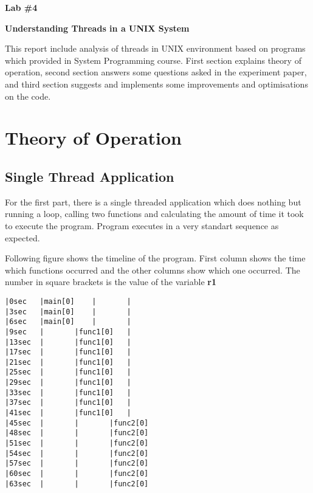 \documentclass[11pt]{article}
\makeatletter
\renewenvironment{titlepage}
    {%
      \cleardoublepage
      \if@twocolumn
        \@restonecoltrue\onecolumn
      \else
        \@restonecolfalse\newpage
      \fi
      \thispagestyle{empty}%
    }%
    {\if@restonecol\twocolumn \else \newpage \fi
    }
\renewenvironment{titlepage}
    {%
      \cleardoublepage
      \if@twocolumn
        \@restonecoltrue\onecolumn
      \else
        \@restonecolfalse\newpage
      \fi
      \thispagestyle{empty}%
    }%
    {\if@restonecol\twocolumn \else \newpage \fi
     \if@twoside\else
     \fi
    }
\makeatother
\begin{document}
\begin{titlepage}
   \begin{center}
       \vspace*{5cm}
 
       \textbf{ \LARGE Lab \#4}
       
       \vspace{0.5cm}
 	\textbf{Understanding Threads in a UNIX System }
 	
       \vspace{0.5cm}
This report include analysis of threads in UNIX environment based on programs which provided in System Programming course. First section explains theory of operation, second section answers some questions asked in the experiment paper, and third section suggests and implements some improvements and optimisations on the code.

 
   \end{center}
\end{titlepage}



\section*{Theory of Operation}

\subsection*{Single Thread Application}
For the first part, there is a single threaded application which does nothing but running a loop, calling two functions and calculating the amount of time it took to execute the program. Program executes in a very standart sequence as expected.

Following figure shows the timeline of the program. First column shows the time which functions occurred and the other columns show which one occurred. The number in square brackets is the value of the variable \textbf{r1}

\begin{minipage}{1\textwidth}
\begin{lstlisting}[title=Timeline (singlethread.c), frame=tlrb]
|0sec	|main[0]	|		|
|3sec	|main[0]	|		|
|6sec	|main[0]	|		|
|9sec	|		|func1[0]	|
|13sec	|		|func1[0]	|
|17sec	|		|func1[0]	|
|21sec	|		|func1[0]	|
|25sec	|		|func1[0]	|
|29sec	|		|func1[0]	|
|33sec	|		|func1[0]	|
|37sec	|		|func1[0]	|
|41sec	|		|func1[0]	|
|45sec	|		|		|func2[0]
|48sec	|		|		|func2[0]
|51sec	|		|		|func2[0]
|54sec	|		|		|func2[0]
|57sec	|		|		|func2[0]
|60sec	|		|		|func2[0]
|63sec	|		|		|func2[0]
\end{lstlisting}
\end{minipage}
\end{document}
